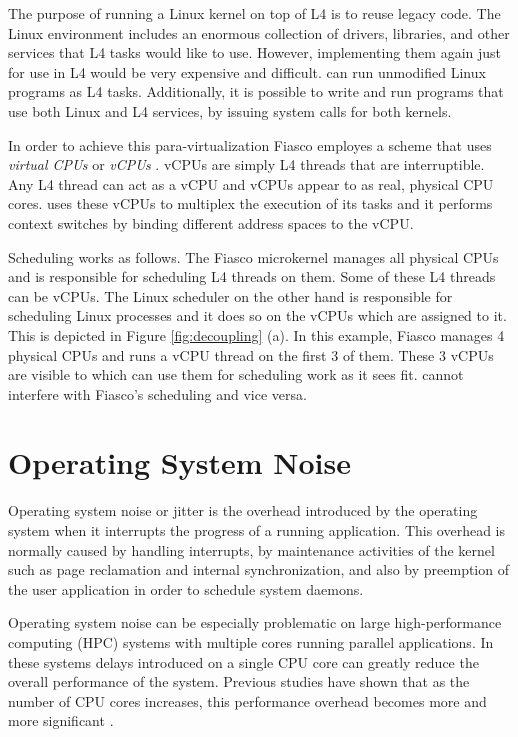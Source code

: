 The purpose of running a Linux kernel on top of L4 is to reuse legacy code.
The Linux environment includes an enormous collection of drivers, libraries,
and other services that L4 tasks would like to use. However, implementing them
again just for use in L4 would be very expensive and difficult. \llinux can run
unmodified Linux programs as L4 tasks. Additionally, it is possible to write
and run programs that use both Linux and L4 services, by issuing system calls
for both kernels.

In order to achieve this para-virtualization Fiasco employes a scheme that uses
\emph{virtual CPUs} or \emph{vCPUs} \cite{vcpus}. vCPUs are simply L4 threads
that are interruptible. Any L4 thread can act as a vCPU and vCPUs appear to
\llinux as real, physical CPU cores. \llinux uses these vCPUs to multiplex the
execution of its tasks and it performs context switches by binding different
address spaces to the vCPU.

Scheduling works as follows. The Fiasco microkernel manages all physical CPUs
and is responsible for scheduling L4 threads on them. Some of these L4 threads
can be vCPUs. The Linux scheduler on the other hand is responsible for
scheduling Linux processes and it does so on the vCPUs which are assigned to
it. This is depicted in Figure \ref{fig:decoupling} (a). In this example,
Fiasco manages 4 physical CPUs and runs a vCPU thread on the first 3 of them.
These 3 vCPUs are visible to \llinux which can use them for scheduling work as
it sees fit. \llinux cannot interfere with Fiasco's scheduling and vice versa.

\section{Operating System Noise}

Operating system noise or jitter is the overhead introduced by the operating
system when it interrupts the progress of a running application. This overhead
is normally caused by handling interrupts, by maintenance activities of the
kernel such as page reclamation and internal synchronization, and also by
preemption of the user application in order to schedule system daemons.

Operating system noise can be especially problematic on large high-performance
computing (HPC) systems with multiple cores running parallel applications. In
these systems delays introduced on a single CPU core can greatly reduce the
overall performance of the system. Previous studies have shown that as the
number of CPU cores increases, this performance overhead becomes more and more
significant \cite{os_noise1}\cite{os_noise2}\cite{os_noise3}.

